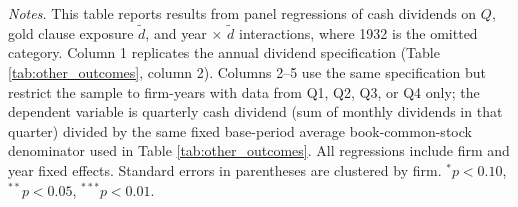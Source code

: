 \begin{table}[p]
\vspace*{3mm} \justifying \noindent
\scriptsize{\textit{Notes.} This table reports results from panel regressions of cash dividends on $Q$, gold clause exposure $\tilde{d}$, and year $\times$ $\tilde{d}$ interactions, where 1932 is the omitted category. Column 1 replicates the annual dividend specification (Table \ref{tab:other_outcomes}, column 2). Columns 2--5 use the same specification but restrict the sample to firm-years with data from Q1, Q2, Q3, or Q4 only; the dependent variable is quarterly cash dividend (sum of monthly dividends in that quarter) divided by the same fixed base-period average book-common-stock denominator used in Table \ref{tab:other_outcomes}. All regressions include firm and year fixed effects. Standard errors in parentheses are clustered by firm. $^{*}p<0.10$, $^{**}p<0.05$, $^{***}p<0.01$.}
\end{table}
